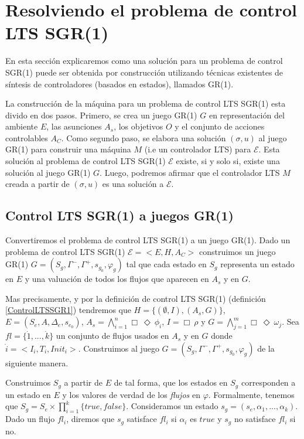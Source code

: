 \section{Resolviendo el problema de control LTS SGR(1)}

En esta sección explicaremos como una solución para un problema de control SGR(1) puede ser obtenida por construcción
utilizando técnicas existentes de síntesis de controladores (basados en estados), llamados GR(1). \cite{Piterman}

La construcción de la máquina para un problema de control LTS SGR(1) esta divido en dos pasos. Primero, se crea un juego GR(1)
$G$ en representación del ambiente $E$, las asunciones $A_s$, los objetivos $O$ y el conjunto de acciones controlables
$A_C$. Como segundo paso, se elabora una solución $(\sigma,u)$ al juego GR(1) para construir una máquina $M$ (i.e un
controlador LTS) para $\mathcal{E}$. Esta solución al problema de control LTS SGR(1) $\mathcal{E}$ existe, si y solo si,
existe una solución al juego GR(1) $G$. Luego, podremos afirmar que el controlador LTS $M$ creada a partir de
$(\sigma,u)$ es una solución a $\mathcal{E}$.

\subsection{Control LTS SGR(1) a juegos GR(1)}

Convertiremos el problema de control LTS SGR(1) a un juego GR(1). Dado un problema de control LTS SGR(1) $\mathcal{E} =
<E,H,A_C>$ construimos un juego GR(1) $G = (S_g,\Gamma^-,\Gamma^+,s_{g_0},\varphi_g)$ tal que cada estado en $S_g$
representa un estado en $E$ y una valuación de todos los flujos que aparecen en $A_s$ y en $G$.

Mas precisamente, y por la definición de control LTS SGR(1) (definición \ref{ControlLTSSGR1}) tendremos que $H =
\{(\emptyset,I),(A_s,G)\}$, $E = (S_e,A,\Delta_e,s_{e_0})$, $A_s = \bigwedge_{i=1}^n\Box\ \Diamond\ \phi_i$, $I = \Box\
\rho$ y $G = \bigwedge_{j=1}^m\Box\ \Diamond\ \omega_j$. Sea $fl = \{\dot1,...,\dot k\}$ un conjunto de flujos usados en
$A_s$ y en $G$ donde $\dot i = <I_i,T_i,Init_i>$. Construimos al juego $G = (S_g,\Gamma^-,\Gamma^+,s_{g_0},\varphi_g)$ de
la siguiente manera.

Construimos $S_g$ a partir de $E$ de tal forma, que los estados en $S_g$ corresponden a un estado en $E$ y los valores
de verdad de los \emph{flujos} en $\varphi$. Formalmente, tenemos que  $S_g = S_e \times \prod_{i=1}^k\{true,false\}$.
Consideramos un estado $s_g = (s_e,\alpha_1,...,\alpha_k)$. Dado un flujo $fl_i$, diremos que $s_g$ satisface $fl_i$ si
$\alpha_i$ es $true$ y $s_g$ no satisface $fl_i$ si no. 

